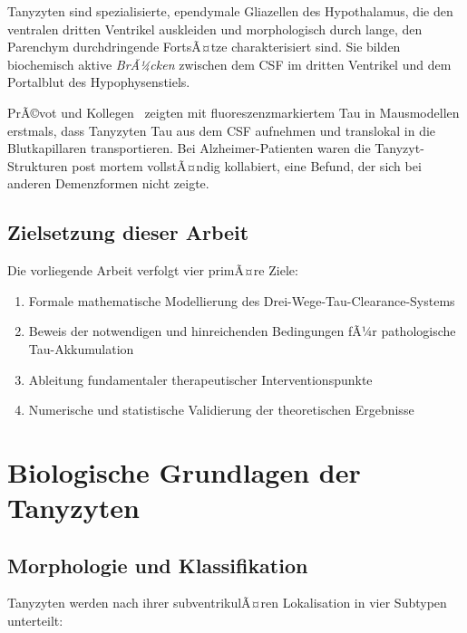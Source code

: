 ﻿\documentclass[12pt,a4paper]{article}
\theoremstyle{definition}
\begin{document}
	Tanyzyten sind spezialisierte, ependymale Gliazellen des Hypothalamus, die den ventralen dritten Ventrikel auskleiden und morphologisch durch lange, den Parenchym durchdringende FortsÃ¤tze charakterisiert sind. Sie bilden biochemisch aktive \emph{BrÃ¼cken} zwischen dem CSF im dritten Ventrikel und dem Portalblut des Hypophysenstiels.
	
	PrÃ©vot und Kollegen~\cite{Prevot2026} zeigten mit fluoreszenzmarkiertem Tau in Mausmodellen erstmals, dass Tanyzyten Tau aus dem CSF aufnehmen und translokal in die Blutkapillaren transportieren. Bei Alzheimer-Patienten waren die Tanyzyt-Strukturen post mortem vollstÃ¤ndig kollabiert, eine Befund, der sich bei anderen Demenzformen nicht zeigte.
	
	\subsection{Zielsetzung dieser Arbeit}
	
	Die vorliegende Arbeit verfolgt vier primÃ¤re Ziele:
	\begin{enumerate}[label=(\arabic*)]
		\item Formale mathematische Modellierung des Drei-Wege-Tau-Clearance-Systems
		\item Beweis der notwendigen und hinreichenden Bedingungen fÃ¼r pathologische Tau-Akkumulation
		\item Ableitung fundamentaler therapeutischer Interventionspunkte
		\item Numerische und statistische Validierung der theoretischen Ergebnisse
	\end{enumerate}
	
	\section{Biologische Grundlagen der Tanyzyten}
	
	\subsection{Morphologie und Klassifikation}
	
	Tanyzyten werden nach ihrer subventrikulÃ¤ren Lokalisation in vier Subtypen unterteilt:
	
\end{document}
